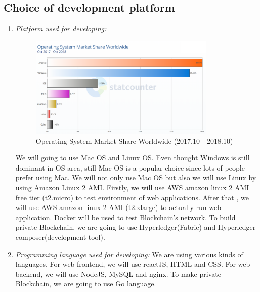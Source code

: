 \documentclass[conference]{IEEEtran}
\begin{document}
\subsection{Choice of development platform}
\begin{enumerate} [font=\itshape]
  \item \textit{Platform used for developing: }
  \begin{figure}[htbp]
	\centerline{\includegraphics[width=89mm,scale=0.5]{graph.png}}
	\caption{Operating System Market Share Worldwide (2017.10 - 2018.10)}
	\label{fig}
	\end{figure}
	
  We will going to use Mac OS and Linux OS. Even thought Windows is still dominant in OS area, still Mac OS is a popular choice since lots of people prefer using Mac. We will not only use Mac OS but also we will use Linux by using Amazon Linux 2 AMI. Firstly, we will use AWS amazon linux 2 AMI free tier (t2.micro) to test environment of web applications. After that , we will use AWS amazon linux 2 AMI (t2.xlarge) to actually run web application. Docker will be used to test Blockchain's network. To build private Blockchain, we are going to use Hyperledger(Fabric) and Hyperledger composer(development tool).\\
  
   \item \textit{Programming language used for developing: }We are using various kinds of languages. For web frontend, we will use reactJS, HTML and CSS. For web backend, we will use NodeJS, MySQL and nginx. To make private Blockchain, we are going to use Go language. \\
   

\end{enumerate}
\end{document}
